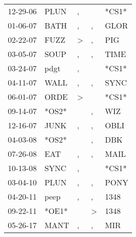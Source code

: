 \begin{supertabular}{lllll}
 12-29-06 &   PLUN &             , &               &  *CS1* \\
 01-06-07 &   BATH &             , &             , &   GLOR \\
 02-22-07 &   FUZZ &  \textgreater &             , &    PIG \\
 03-05-07 &   SOUP &             , &             , &   TIME \\
 03-24-07 &   pdgt &             , &               &  *CS1* \\
 04-11-07 &   WALL &             , &             , &   SYNC \\
 06-01-07 &   ORDE &  \textgreater &               &  *CS1* \\
 09-14-07 &  *OS2* &               &             , &    WIZ \\
 12-16-07 &   JUNK &             , &             , &   OBLI \\
 04-03-08 &  *OS2* &               &             , &    DBK \\
 07-26-08 &    EAT &             , &             , &   MAIL \\
 10-13-08 &   SYNC &             , &               &  *CS1* \\
 03-04-10 &   PLUN &             , &             , &   PONY \\
 04-20-11 &   peep &             , &             , &   1348 \\
 09-22-11 &  *OE1* &               &  \textgreater &   1348 \\
 05-26-17 &   MANT &             , &             , &    MIR \\
\end{supertabular}
